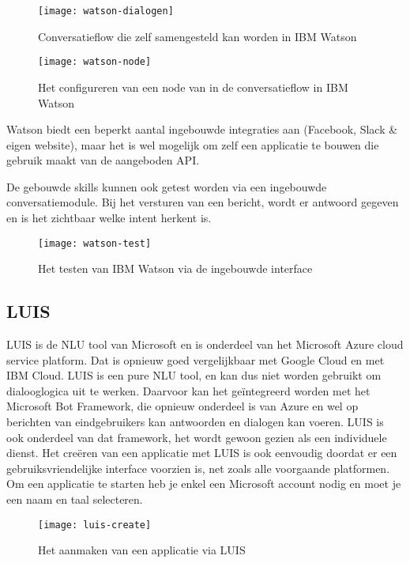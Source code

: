 \begin{figure}[H]
    \label{fig:watson-dialogen}
    \centering
    \texttt{[image: watson-dialogen]}
    \caption{Conversatieflow die zelf samengesteld kan worden in IBM Watson}
\end{figure}

\begin{figure}[H]
    \label{fig:watson-node}
    \centering
    \texttt{[image: watson-node]}
    \caption{Het configureren van een node van in de conversatieflow in IBM Watson}
\end{figure}

Watson biedt een beperkt aantal ingebouwde integraties aan (Facebook, Slack \& eigen website), maar het is wel mogelijk om zelf een applicatie te bouwen die gebruik maakt van de aangeboden API.

De gebouwde skills kunnen ook getest worden via een ingebouwde conversatiemodule. Bij het versturen van een bericht, wordt er antwoord gegeven en is het zichtbaar welke intent herkent is.

\begin{figure}[H]
    \label{fig:watson-test}
    \centering
    \texttt{[image: watson-test]}
    \caption{Het testen van IBM Watson via de ingebouwde interface}
\end{figure}

\subsection{LUIS}
\label{subsec:werking-platformen-luis}

LUIS is de NLU tool van Microsoft en is onderdeel van het Microsoft Azure cloud service platform. Dat is opnieuw goed vergelijkbaar met Google Cloud en met IBM Cloud. LUIS is een pure NLU tool, en kan dus niet worden gebruikt om dialooglogica uit te werken. Daarvoor kan het geïntegreerd worden met het Microsoft Bot Framework, die opnieuw onderdeel is van Azure en wel op berichten van eindgebruikers kan antwoorden en dialogen kan voeren. LUIS is ook onderdeel van dat framework, het wordt gewoon gezien als een individuele dienst. Het creëren van een applicatie met LUIS is ook eenvoudig doordat er een gebruiksvriendelijke interface voorzien is, net zoals alle voorgaande platformen. Om een applicatie te starten heb je enkel een Microsoft account nodig en moet je een naam en taal selecteren.

\begin{figure}[H]
    \label{fig:luis-create}
    \centering
    \texttt{[image: luis-create]}
    \caption{Het aanmaken van een applicatie via LUIS}
\end{figure}


